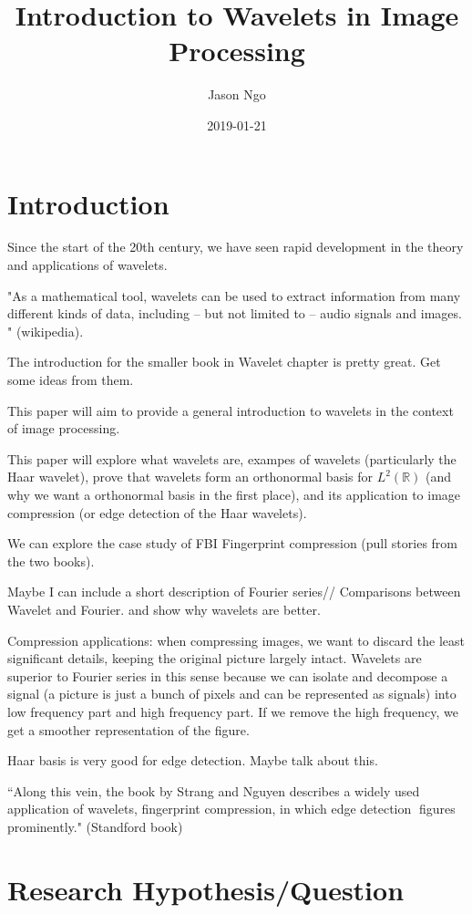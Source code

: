 \documentclass[11pt]{amsart}
\title{Introduction to Wavelets in Image Processing}
\author{Jason Ngo}
\date{2019-01-21}
\theoremstyle{theorem} %
\theoremstyle{definition}                  %
\theoremstyle{example}                       %
\theoremstyle{remark}                       %
\numberwithin{equation}{section}
\newcommand{\R}{\mathbb{R}}
\begin{document}
\maketitle

\section{Introduction}

Since the start of the 20th century, we have seen rapid development in the theory and applications of wavelets. 

"As a mathematical tool, wavelets can be used to extract information from many different kinds of data, including – but not limited to – audio signals and images. " (wikipedia).

The introduction for the smaller book in Wavelet chapter is pretty great. Get some ideas from them.

This paper will aim to provide a general introduction to wavelets in the context of image processing.

This paper will explore what wavelets are, exampes of wavelets (particularly the Haar wavelet), prove that wavelets form an orthonormal basis for $ L^2(\R) $ (and why we want a orthonormal basis in the first place), and its application to image compression (or edge detection of the Haar wavelets).

We can explore the case study of FBI Fingerprint compression (pull stories from the two books).

Maybe I can include a short description of Fourier series// Comparisons between Wavelet and Fourier. and show why wavelets are better.

Compression applications: when compressing images, we want to discard the least significant details, keeping the original picture largely intact. Wavelets are superior to Fourier series in this sense because we can isolate and decompose a signal (a picture is just a bunch of pixels and can be represented as signals) into low frequency part and high frequency part. If we remove the high frequency, we get a smoother representation of the figure.

Haar basis is very good for edge detection. Maybe talk about this.

``Along this vein, the book by Strang and Nguyen describes a widely used application of wavelets, fingerprint compression, in which edge detection figures prominently." (Standford book)

\section{Research Hypothesis/Question}
\end{document}
